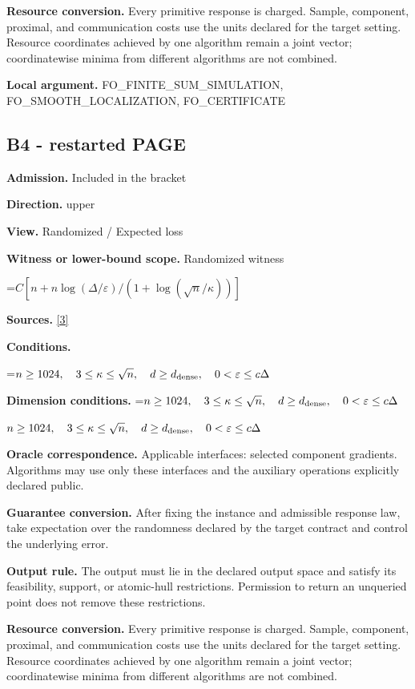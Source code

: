 \documentclass[10pt,a4paper]{article}
\newcommand{\AtlasMath}[1]{\par\begingroup\centering\setbox0=\hbox{$\displaystyle #1$}\ifdim\wd0>1.4\linewidth\typeout{ATLAS WIDE FORMULA: \the\wd0}\fi\ifdim\wd0>\linewidth\resizebox{\linewidth}{!}{\box0}\else\box0\fi\par\endgroup}
\newcommand{\AtlasInlineMath}[1]{\begingroup\setbox0=\hbox{$#1$}\ifdim\wd0>.4\linewidth\endgroup\AtlasMath{#1}\else\endgroup$#1$\fi}
\begin{document}
\textbf{Resource conversion.} Every primitive response is charged. Sample, component, proximal, and communication costs use the units declared for the target setting. Resource coordinates achieved by one algorithm remain a joint vector; coordinatewise minima from different algorithms are not combined.

\textbf{Local argument.} FO\_\allowbreak{}FINITE\_\allowbreak{}SUM\_\allowbreak{}SIMULATION, FO\_\allowbreak{}SMOOTH\_\allowbreak{}LOCALIZATION, FO\_\allowbreak{}CERTIFICATE

\subsection{B4 - restarted PAGE}
\textbf{Admission.} Included in the bracket

\textbf{Direction.} upper

\textbf{View.} Randomized / Expected loss

\textbf{Witness or lower-bound scope.} Randomized witness

\AtlasMath{C[n+n\log(\Delta/\varepsilon)/(1+\log(\sqrt n/\kappa))]}
\textbf{Sources.} \href{https://arxiv.org/pdf/2609.00045v3}{[3]}

\textbf{Conditions.} 
\AtlasMath{n\ge1024,\quad3\le\kappa\le\sqrt n,\quad d\ge d_{\rm dense},\quad0<\varepsilon\le c\Delta}


\textbf{Dimension conditions.} \AtlasInlineMath{n\ge1024,\quad3\le\kappa\le\sqrt n,\quad d\ge d_{\rm dense},\quad0<\varepsilon\le c\Delta}

\textbf{Oracle correspondence.} Applicable interfaces: selected component gradients. Algorithms may use only these interfaces and the auxiliary operations explicitly declared public.

\textbf{Guarantee conversion.} After fixing the instance and admissible response law, take expectation over the randomness declared by the target contract and control the underlying error.

\textbf{Output rule.} The output must lie in the declared output space and satisfy its feasibility, support, or atomic-hull restrictions. Permission to return an unqueried point does not remove these restrictions.

\textbf{Resource conversion.} Every primitive response is charged. Sample, component, proximal, and communication costs use the units declared for the target setting. Resource coordinates achieved by one algorithm remain a joint vector; coordinatewise minima from different algorithms are not combined.
\end{document}
